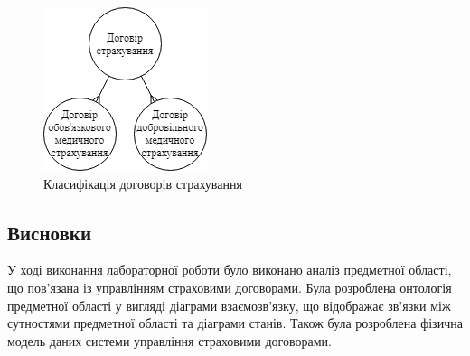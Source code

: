 \begin{figure}[H]
    \centering
        \includegraphics{idef_classification}
    \caption{Класифікація договорів страхування}
    \label{fig:idef_classification}
\end{figure}

\subsection*{Висновки}
У ході виконання лабораторної роботи було виконано аналіз предметної області, що пов'язана із управлінням страховими договорами. Була розроблена онтологія предметної області у вигляді діаграми взаємозв'язку, що відображає зв'язки між сутностями предметної області та діаграми станів. Також була розроблена фізична модель даних системи управління страховими договорами.


